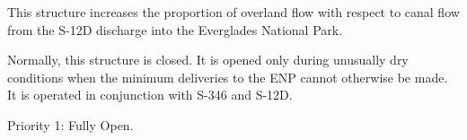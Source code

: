This structure increases the proportion of overland flow with respect to canal flow from the S-12D discharge into the Everglades National Park.

Normally, this structure is closed. It is opened only during unusually dry conditions when the minimum deliveries to the ENP cannot otherwise be made. It is operated in conjunction with S-346 and S-12D.





\begin{packed_items}
\item Priority 1: Fully Open.
\end{packed_items}

%
%
%

